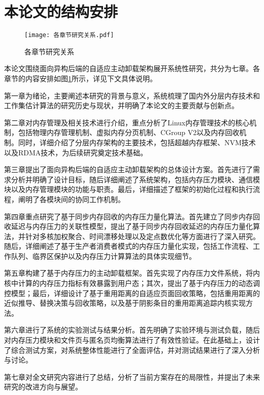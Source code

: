 \section{本论文的结构安排}

\begin{figure}[htb]
    \centering
    \texttt{[image: 各章节研究关系.pdf]}
    \caption{各章节研究关系}
    \label{各章节研究关系}
\end{figure}

本论文围绕面向异构后端的自适应主动卸载架构展开系统性研究，共分为七章。各章节的内容安排如图\ref{各章节研究关系}所示，详见下文具体说明。

第一章为绪论，主要阐述本研究的背景与意义，系统梳理了国内外分层内存技术和工作集估计算法的研究历史与现状，并明确了本论文的主要贡献与创新点。

第二章对内存管理及相关技术进行介绍，重点分析了Linux内存管理技术的核心机制，包括物理内存管理机制、虚拟内存分页机制、CGroup V2以及内存回收机制。同时，详细介绍了分层内存架构的主要技术，包括超越内存框架、NVM技术以及RDMA技术，为后续研究奠定技术基础。

第三章提出了面向异构后端的自适应主动卸载架构的总体设计方案。首先进行了需求分析并明确了设计目标，随后详细阐述了系统架构，包括内存压力模块、通信模块以及内存管理模块的功能与职责。最后，详细描述了框架的初始化过程和执行流程，阐明了各模块间的协同工作机制。

第四章重点研究了基于同步内存回收的内存压力量化算法。首先建立了同步内存回收延迟与内存压力的关联性模型，提出了基于同步内存回收延迟的内存压力量化算法，并针对多核加权聚合、时间漂移处理以及定点数优化等方面进行了深入研究。随后，详细阐述了基于生产者消费者模式的内存压力量化实现，包括工作流程、工作队列、临界区保护以及内存压力计算算法的具体实现细节。

第五章构建了基于内存压力的主动卸载框架。首先实现了内存压力文件系统，将内核中计算的内存压力指标有效暴露到用户态；其次，提出了基于内存压力的动态调控模型；最后，详细设计了基于重用距离的自适应页面回收策略，包括重用距离的近似推导、替换决策与回收策略，以及基于阴影条目的重用距离追踪内核实现方法。

第六章进行了系统的实验测试与结果分析。首先明确了实验环境与测试负载，随后对内存压力模块和文件页与匿名页均衡算法进行了有效性验证。在此基础上，设计了综合测试方案，对系统整体性能进行了全面评估，并对测试结果进行了深入分析与讨论。

第七章对全文研究内容进行了总结，分析了当前方案存在的局限性，并提出了未来研究的改进方向与展望。


